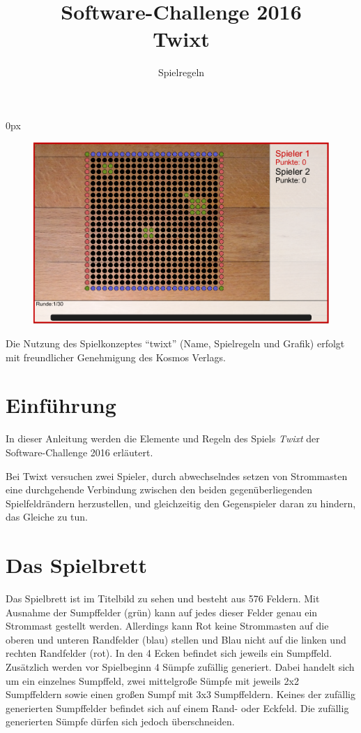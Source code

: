 \documentclass[a4paper, ngerman]{scrartcl}
\title{Software-Challenge 2016 \\ Twixt}
\subtitle{Spielregeln}
\begin{document}
\parindent0px
\maketitle

\begin{figure}[h!]
        \centering
        \includegraphics[width=\linewidth]{bilder/gui.png}
\end{figure}
\vspace*{\fill}

Die Nutzung des Spielkonzeptes "`twixt"' (Name, Spielregeln und Grafik)
erfolgt mit freundlicher Genehmigung des Kosmos Verlags.

\newpage

\tableofcontents

\newpage

\section{Einführung}

In dieser Anleitung werden die Elemente und Regeln des Spiels \emph{Twixt} der
Software-Challenge 2016 erläutert.

Bei Twixt versuchen zwei Spieler, durch abwechselndes setzen von Strommasten
eine durchgehende Verbindung zwischen den beiden gegenüberliegenden Spielfeldrändern
herzustellen, und gleichzeitig den Gegenspieler daran zu hindern, das Gleiche zu
tun. 

\section{Das Spielbrett}
Das Spielbrett ist im Titelbild zu sehen und besteht aus 576 Feldern.
Mit Ausnahme der Sumpffelder (grün) kann auf jedes dieser Felder genau 
ein Strommast gestellt werden. Allerdings kann Rot keine Strommasten auf 
die oberen und unteren Randfelder (blau) stellen und Blau nicht auf die linken 
und rechten Randfelder (rot). In den 4 Ecken befindet sich jeweils ein Sumpffeld. 
Zusätzlich werden vor Spielbeginn 4 Sümpfe zufällig generiert. Dabei handelt sich um 
ein einzelnes Sumpffeld, zwei mittelgroße Sümpfe mit jeweils 2x2 Sumpffeldern 
sowie einen großen Sumpf mit 3x3 Sumpffeldern. Keines der zufällig generierten Sumpffelder 
befindet sich auf einem Rand- oder Eckfeld. Die zufällig generierten Sümpfe dürfen 
sich jedoch überschneiden.
\end{document}

